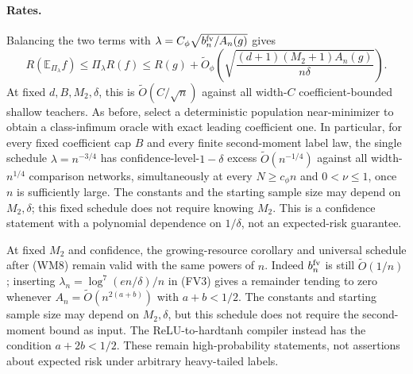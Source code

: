 \paragraph{Rates.}
Balancing the two terms with
$\lambda=C_\phi\sqrt{b_n^{\rm fv}/A_n(g)}$ gives
\[
 R(\mathbb E_{\Pi_\lambda}f)\le\Pi_\lambda R(f)
 \le R(g)+\widetilde O_\phi\left(
       \sqrt{\frac{(d+1)(M_2+1)A_n(g)}{n\delta}}\right). \tag{FV4}
\]
At fixed $d,B,M_2,\delta$, this is $\widetilde O(C/\sqrt n)$ against
all width-$C$ coefficient-bounded shallow teachers. As before, select a
deterministic population near-minimizer to obtain a class-infimum
oracle with exact leading coefficient one.
In particular, for every fixed coefficient cap $B$ and every finite
second-moment label law, the single schedule $\lambda=n^{-3/4}$ has
confidence-level-$1-\delta$ excess $\widetilde O(n^{-1/4})$ against all
width-$n^{1/4}$ comparison networks, simultaneously at every $N\ge c_\phi n$
and $0<\nu\le1$, once $n$ is sufficiently large.
The constants and the starting sample size may depend on $M_2,\delta$;
this fixed schedule does not require knowing $M_2$.
This is a confidence statement with a polynomial dependence on
$1/\delta$, not an expected-risk guarantee.

At fixed $M_2$ and confidence, the growing-resource corollary and
universal schedule after (WM8) remain valid with the same powers of
$n$. Indeed $b_n^{\rm fv}$ is still $\widetilde O(1/n)$; inserting
$\lambda_n=\log^7(e n/\delta)/n$ in (FV3) gives a remainder tending
to zero whenever $A_n=\widetilde O(n^{2(a+b)})$ with $a+b<1/2$.
The constants and starting sample size may depend on $M_2,\delta$,
but this schedule does not require the second-moment bound as input.
The ReLU-to-hardtanh compiler instead has the condition $a+2b<1/2$.
These remain high-probability statements, not assertions about expected
risk under arbitrary heavy-tailed labels.
